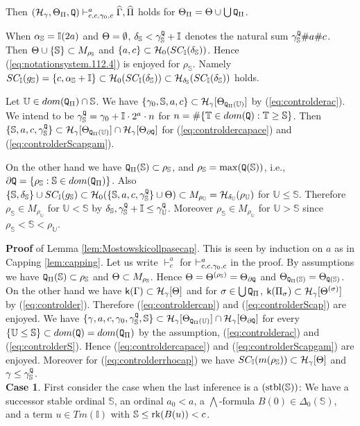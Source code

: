\documentclass{article}
\newcommand{\mS}{\mathbb{S}}
\newcommand{\mI}{\mathbb{I}}
\newcommand{\mT}{\mathbb{T}}
\newcommand{\mU}{\mathbb{U}}
\begin{document}
Then
$(\mathcal{H}_{\gamma},\Theta_{\Pi}, {\tt Q})
\vdash^{a}_{c,c,\gamma_{0},c}
\widehat{\Gamma},\widehat{\Pi}$ holds for
$\Theta_{\Pi}=\Theta\cup\bigcup{\tt Q}_{\Pi}$.


\elem

\brem\label{rem:Mostowskicollpasecap}
{\rm 
When $\alp_{\mS}=\mI(2a)$ and $\Theta=\emptyset$, 
$\delta_{\mS}<\gam_{\mS}^{{\tt Q}}+\mI$ denotes the natural sum
$\gam_{\mS}^{{\tt Q}}\#a\#c$.
Then
$\Tht\cup\{\mS\}\subset M_{\rho_{\mS}}$ and
$\{a,c\}\subset \mathcal{H}_{0}(SC_{\mI}(\del_{\mS}))$.
Hence
 (\ref{eq:notationsystem.112.4}) is enjoyed for $\rho_{\mS}$.
 Namely 
$SC_{\mI}(g_{\mS})=\{c,\alp_{\mS}+\mI\}\subset 
\mathcal{H}_{0}(SC_{\mI}(\del_{\mS}))\subset\mathcal{H}_{\del_{\mS}}(SC_{\mI}(\del_{\mS}))$
holds.

Let $\mU\in dom({\tt Q}_{\Pi})\cap\mS$.
We have $\{\gam_{0},\mS,a,c\}\subset\calh_{\gam}[\Tht_{{\tt Q}_{\Pi}(\mU)}]$
by (\ref{eq:controlderac}).
We intend to be $\gam_{\mS}^{{\tt Q}}=\gam_{0}+\mI\cdot 2^{a}\cdot n$
for $n=\#\{\mT\in dom({\tt Q}): \mT\geq \mS\}$.
Then
$\{\mS,a,c,\gam_{\mS}^{{\tt Q}}\}\subset\calh_{\gam}[\Tht_{{\tt Q}_{\Pi}(\mU)}]\cap
\calh_{\gam}[\Tht_{\partial{\tt Q}}]$
for (\ref{eq:controldercapace}) and (\ref{eq:controlderScapgam}).

On the other hand we have ${\tt Q}_{\Pi}(\mS)\subset\rho_{\mS}$, and
$\rho_{\mS}=\max({\tt Q}(\mS))$, i.e., $\partial{\tt Q}=\{\rho_{\mS}: \mS\in dom({\tt Q}_{\Pi})\}$.
Also $\{\mS,\del_{\mS}\}\cup SC_{\mI}(g_{\mS})\subset
\calh_{0}(\{\mS,a,c,\gam_{\mS}^{{\tt Q}}\}\cup \Tht)
\subset M_{\rho_{\mU}}=\calh_{\del_{\mU}}(\rho_{\mU})$ for $\mU\leq\mS$.
Therefore $\rho_{\mS}\in M_{\rho_{\mU}}$ for $\mU<\mS$ by 
$\del_{\mS},\gam_{\mS}^{{\tt Q}}+\mI\leq\gam_{\mU}^{{\tt Q}}$.
Moreover  $\rho_{\mS}\in M_{\rho_{\mU}}$ for $\mU>\mS$ since
$\rho_{\mS}<\mS<\rho_{\mU}$.
}
\erem
\textbf{Proof} of Lemma \ref{lem:Mostowskicollpasecap}.
This is seen
by induction on $a$ as in Capping \ref{lem:capping}.
Let us 
write $\vdash^{a}_{c}$ for $\vdash^{a}_{c,c,\gamma_{0},c}$ in the proof.
By assumptions we have
${\tt Q}_{\Pi}(\mS)\subset\rho_{\mS}$ and
$\Tht\subset M_{\rho_{\mS}}$.
Hence $\Tht=\Tht^{(\rho_{\mS})}=\Tht_{\partial{\tt Q}}$ and
$\Tht_{{\tt Q}_{\Pi}(\mS)}=\Tht_{{\tt Q}(\mS)}$.
On the other hand we have
${\sf k}(\Gamma)\subset{\cal H}_{\gamma}[\Theta]$ and for
$\sigma\in\bigcup{\tt Q}_{\Pi}$, ${\sf k}(\Pi_{\sigma})\subset{\cal H}_{\gamma}[\Theta^{(\sigma)}]$
by (\ref{eq:controlder}).
Therefore (\ref{eq:controldercap}) and (\ref{eq:controlderScap}) are enjoyed.
We have $\{\gam,a,c,\gam_{0},\gam_{\mS}^{{\tt Q}},\mS\}\subset\calh_{\gam}[\Tht_{{\tt Q}_{\Pi}(\mU)}]
\cap\calh_{\gam}[\Tht_{\partial{\tt Q}}]$ 
for
every $\{\mU\leq\mS\}\subset dom({\tt Q})=dom({\tt Q}_{\Pi})$ by the assumption, 
(\ref{eq:controlderac}) and (\ref{eq:controlderS}).
Hence (\ref{eq:controldercapace}) and (\ref{eq:controlderScapgam}) are enjoyed.
Moreover for (\ref{eq:controlderrhocap}) we have 
$SC_{\mI}(m(\rho_{\mS}))\subset\calh_{\gam}[\Tht]$ and $\gam\leq\gam_{\mS}^{{\tt Q}}$.
\\
\textbf{Case 1}.
First consider the case when the last inference is a $({\rm stbl}(\mS))$: 
We have a successor stable ordinal $\mS$,
an ordinal $a_{0}<a$,
a $\bigwedge$-formula
$B(0)\in\Delta_{0}(\mathbb{S})$, and
a term $u\in Tm(\mI)$ with $\mS\leq\rk(B(u))<c$.
\end{document}
